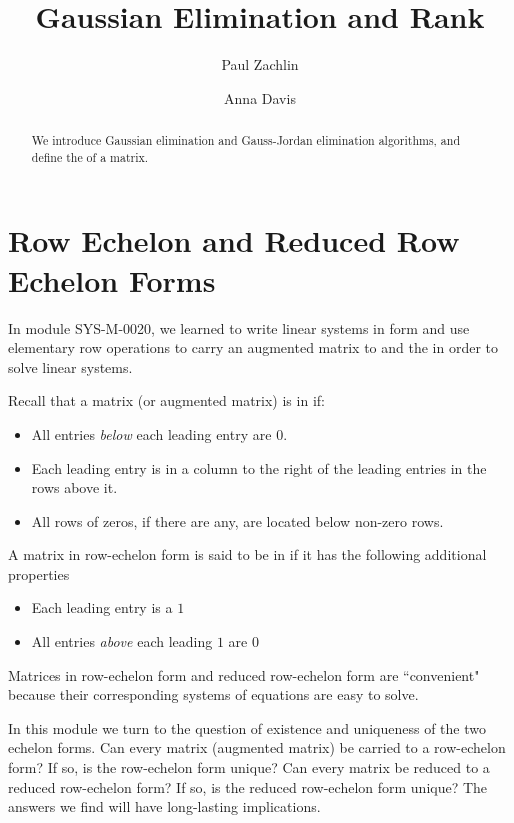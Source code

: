 \documentclass{ximera}
\author{Paul Zachlin \and Anna Davis} \title{Gaussian Elimination and Rank} \license{CC-BY 4.0}
\begin{document}
\begin{abstract}
 We introduce Gaussian elimination and Gauss-Jordan elimination algorithms, and define the  of a matrix.
\end{abstract}
\maketitle

\section*{Row Echelon and Reduced Row Echelon Forms}

In module SYS-M-0020, we learned to write linear systems in  form and use elementary row operations to carry an augmented matrix to  and the  in order to solve linear systems.  

Recall that a matrix (or augmented matrix) is in  if:
\begin{itemize}
\item All entries {\it below} each leading entry are $0$.
\item Each leading entry is in a column to the right of the leading entries in the rows above it.
\item All rows of zeros, if there are any, are located below non-zero rows.
\end{itemize}

A matrix in row-echelon form is said to be in  if it has the following additional properties
\begin{itemize}
\item Each leading entry is a $1$
\item All entries {\it above} each leading $1$ are $0$
\end{itemize}


Matrices in row-echelon form and reduced row-echelon form are ``convenient" because their corresponding systems of equations are easy to solve.  

In this module we turn to the question of existence and uniqueness of the two echelon forms.  Can every matrix (augmented matrix) be carried to a row-echelon form?  If so, is the row-echelon form unique?  Can every matrix be reduced to a reduced row-echelon form?  If so, is the reduced row-echelon form unique?  The answers we find will have long-lasting implications.
\end{document}

